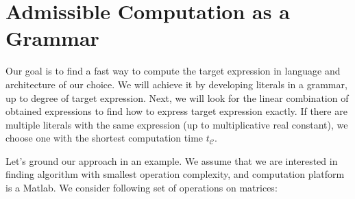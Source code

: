 \section{Admissible Computation as a Grammar}\label{sec:grammars}

Our goal is to find a fast way to compute the target expression in
language and architecture of our choice. We will achieve it by
developing literals in a grammar, up to degree of target
expression. Next, we will look for the linear combination of obtained
expressions to find how to express target expression exactly. If there
are multiple literals with the same expression (up to multiplicative real
constant), we choose one with the shortest computation time $t_\mathcal{C}$.

Let's ground our approach in an example. We assume that we are interested in
finding algorithm with smallest operation complexity, and computation platform
is a Matlab. We consider following set of operations on matrices: 


